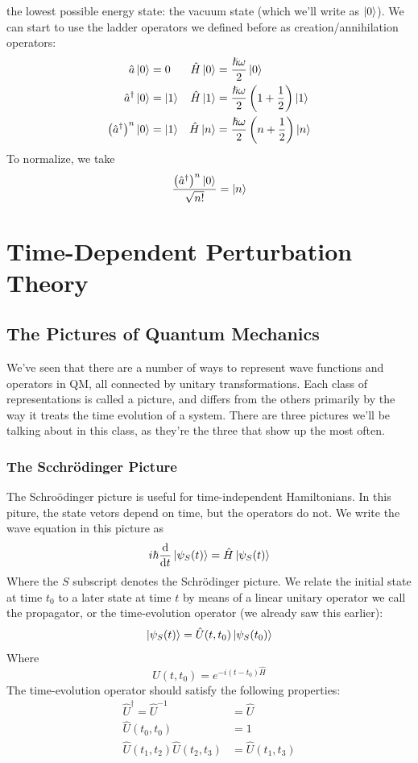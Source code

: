 \documentclass[a4paper]{article}
\begin{document}
the lowest possible energy state: the vacuum state (which we'll write as
$\left\lvert 0\right\rangle$). We can start to use the
ladder operators we defined before as creation/annihilation operators:
\begin{align*}
	\hat{a}\left\lvert 0\right\rangle &= 0 &
	\hat{H}\left\lvert 0\right\rangle &= \frac{\hslash\omega}{2}\left\lvert 0\right\rangle\\
	\hat{a}^\dagger\left\lvert 0\right\rangle &= \left\lvert 1\right\rangle &
	\hat{H}\left\lvert 1\right\rangle &= \frac{\hslash\omega}{2}
		\left(1+\frac12\right)\left\lvert 1\right\rangle\\
	\left(\hat{a}^\dagger\right)^n\left\lvert 0\right\rangle &= \left\lvert 1\right\rangle &
	\hat{H}\left\lvert n\right\rangle &= \frac{\hslash\omega}{2}
		\left(n+\frac12\right)\left\lvert n\right\rangle\\
\end{align*}
To normalize, we take
\[ \frac{\left(\hat{a}^\dagger\right)^n\left\lvert 0\right\rangle}{\sqrt{n!}} = \left\lvert n\right\rangle \]

\section{Time-Dependent Perturbation Theory}
\subsection{The Pictures of Quantum Mechanics}
We've seen that there are a number of ways to represent wave functions and
operators in QM, all connected by unitary transformations. Each class of
representations is called a picture, and differs from the others primarily
by the way it treats the time evolution of a system. There are three pictures
we'll be talking about in this class, as they're the three that show up the
most often.

\subsubsection{The Scchr\"odinger Picture}
The Schro\"odinger picture is useful for time-independent Hamiltonians. In this
piture, the state vetors depend on time, but the operators do not. We write
the wave equation in this picture as
\[ i\hslash\frac{\mathrm{d} }{\mathrm{d} t}\left\lvert \psi_S(t)\right\rangle = \hat{H}\left\lvert \psi_S(t)\right\rangle \]
Where the $S$ subscript denotes the Schr\"odinger picture. We relate the
initial state at time $t_0$ to a later state at time $t$ by means of a linear
unitary operator we call the propagator, or the time-evolution operator (we
already saw this earlier):
\[ \left\lvert \psi_S(t)\right\rangle = \hat{U}(t,t_0)\left\lvert \psi_S(t_0)\right\rangle \]
Where
\[ \hat{U}(t,t_0) = e^{-i(t-t_0)\hat{H}} \]
The time-evolution operator should satisfy the following properties:
\begin{align*}
	\hat{U}^\dagger = \hat{U}^{-1} &= \hat{U}\\
	\hat{U}(t_0,t_0) &= 1\\
	\hat{U}(t_1,t_2)\hat{U}(t_2,t_3) &= \hat{U}(t_1,t_3)
\end{align*}
\end{document}
